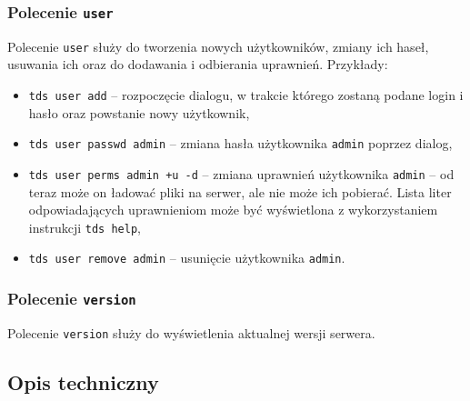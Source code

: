 \documentclass[8pt,a4paper]{article}
\begin{document}
\subsubsection{Polecenie \texttt{user}}
Polecenie \texttt{user} służy do tworzenia nowych użytkowników, zmiany ich haseł, usuwania ich oraz do dodawania i odbierania uprawnień. Przykłady:
\begin{itemize}
    \item \texttt{tds user add} -- rozpoczęcie dialogu, w trakcie którego zostaną podane login i hasło oraz powstanie nowy użytkownik,
    \item \texttt{tds user passwd admin} -- zmiana hasła użytkownika \texttt{admin} poprzez dialog,
    \item \texttt{tds user perms admin +u -d} -- zmiana uprawnień użytkownika \texttt{admin} -- od teraz może on ładować pliki na serwer, ale nie może ich pobierać. Lista liter odpowiadających uprawnieniom może być wyświetlona z wykorzystaniem instrukcji \texttt{tds help},
    \item \texttt{tds user remove admin} -- usunięcie użytkownika \texttt{admin}.
\end{itemize}

\subsubsection{Polecenie \texttt{version}}
Polecenie \texttt{version} służy do wyświetlenia aktualnej wersji serwera.

\subsection{Opis techniczny}
\end{document}
